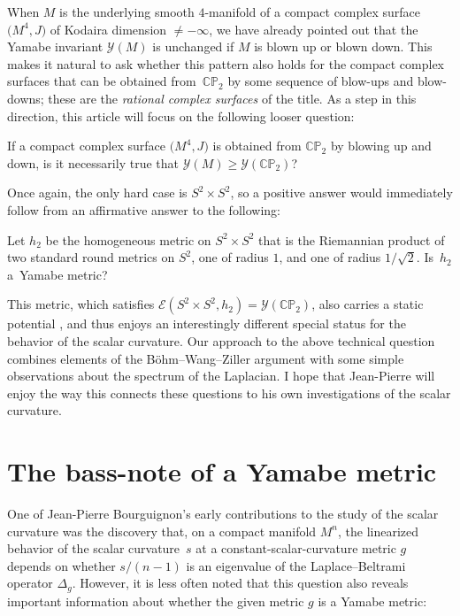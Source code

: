 \documentclass[pdftex]{sigma}
\numberwithin{equation}{section}
\def\CP{\mathbb{CP}}
\begin{document}
When $M$ is the underlying smooth $4$-manifold of a compact complex surface $\big(M^4, J\big)$ of Kodaira dimension $\neq -\infty$,
we have already pointed out that
the Yamabe invariant $\mathscr{Y}(M)$ is
unchanged if $M$ is blown up or blown down. This makes it natural to ask whether this pattern
also holds for the compact complex surfaces that can be obtained from~$\CP_2$ by some
 sequence of blow-ups and blow-downs; these are the
{\em rational complex surfaces} of the title. As a step in this direction, this article will focus
 on the following looser question:

\begin{question} If a compact complex surface $\big(M^4, J\big)$ is obtained from $\CP_2$ by blowing up and down, is it necessarily true that $\mathscr{Y}(M)\geq \mathscr{Y}(\CP_2)$?
\end{question}

Once again, the only hard case is $S^2 \times S^2$, so
a positive answer would immediately follow from an affirmative answer to the following:

\begin{question2} Let $h_2$ be the homogeneous metric on $S^2 \times S^2$ that is the Riemannian product of two standard round metrics on $S^2$, one of radius $1$,
and one of radius $1/\sqrt{2}$. Is~$h_2$ a~Yamabe metric?
\end{question2}

This metric, which satisfies $\mathscr{E}(S^2\times S^2, h_2) = \mathscr{Y} (\CP_2)$, also carries a static potential \cite{ambrozio,corvino,lafontaine},
and thus enjoys an interestingly different special status for the behavior of the scalar curvature.
 Our approach to the above technical question combines elements of the B\"ohm--Wang--Ziller argument with some simple observations about the spectrum of the
 Laplacian. I hope that Jean-Pierre will enjoy the way this connects these questions to his own investigations of the scalar curvature.

\section{The bass-note of a Yamabe metric}

One of Jean-Pierre Bourguignon's early contributions \cite{bes,bourguignon} to the study of the scalar curvature
was the discovery that, on a compact manifold $M^n$, the linearized behavior of the scalar curvature~$s$ at a constant-scalar-curvature
metric $g$ depends on whether $s/(n-1)$
is an eigenvalue of the Laplace--Beltrami operator $\Delta_g$. However, it is less often noted
 that this question also reveals important information about whether the given metric $g$ is a Yamabe metric:
\end{document}
